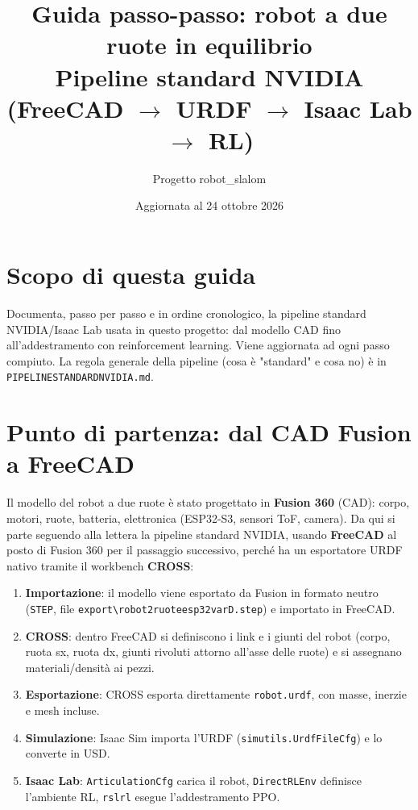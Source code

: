 \documentclass[11pt,a4paper]{article}
\title{Guida passo-passo: robot a due ruote in equilibrio\\\large Pipeline standard NVIDIA (FreeCAD $\to$ URDF $\to$ Isaac Lab $\to$ RL)}
\author{Progetto robot\_slalom}
\date{Aggiornata al 24 ottobre 2026}
\renewcommand{\_}{\oldunderscore\allowbreak}
\begin{document}
\maketitle
\sloppy

\section*{Scopo di questa guida}
Documenta, passo per passo e in ordine cronologico, la pipeline standard NVIDIA/Isaac Lab usata in questo
progetto: dal modello CAD fino all'addestramento con reinforcement learning. Viene aggiornata ad ogni
passo compiuto. La regola generale della pipeline (cosa \`e "standard" e cosa no) \`e in
\texttt{PIPELINE\_STANDARD\_NVIDIA.md}.

\tableofcontents

\section{Punto di partenza: dal CAD Fusion a FreeCAD}
Il modello del robot a due ruote \`e stato progettato in \textbf{Fusion 360} (CAD): corpo, motori, ruote,
batteria, elettronica (ESP32-S3, sensori ToF, camera). Da qui si parte seguendo alla lettera la pipeline
standard NVIDIA, usando \textbf{FreeCAD} al posto di Fusion 360 per il passaggio successivo, perch\'e ha un
esportatore URDF nativo tramite il workbench \textbf{CROSS}:

\begin{enumerate}[leftmargin=*]
  \item \textbf{Importazione}: il modello viene esportato da Fusion in formato neutro (\texttt{STEP},
    file \texttt{export\textbackslash robot\_2ruote\_esp32\_varD.step}) e importato in FreeCAD.
  \item \textbf{CROSS}: dentro FreeCAD si definiscono i link e i giunti del robot (corpo, ruota sx, ruota
    dx, giunti rivoluti attorno all'asse delle ruote) e si assegnano materiali/densit\`a ai pezzi.
  \item \textbf{Esportazione}: CROSS esporta direttamente \texttt{robot.urdf}, con masse, inerzie e mesh
    incluse.
  \item \textbf{Simulazione}: Isaac Sim importa l'URDF (\texttt{sim\_utils.UrdfFileCfg}) e lo converte in
    USD.
  \item \textbf{Isaac Lab}: \texttt{ArticulationCfg} carica il robot, \texttt{DirectRLEnv} definisce
    l'ambiente RL, \texttt{rsl\_rl} esegue l'addestramento PPO.
\end{enumerate}
\end{document}
